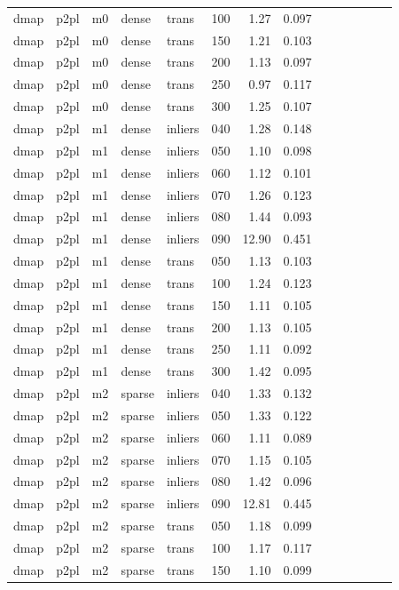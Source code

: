 \begin{table}[htbp]
\begin{tabular}{llllllrrrrrrrr}
  dmap & p2pl & m0 & dense & trans & 100 & 1.27 & 0.097 \\
  dmap & p2pl & m0 & dense & trans & 150 & 1.21 & 0.103 \\
  dmap & p2pl & m0 & dense & trans & 200 & 1.13 & 0.097 \\
  dmap & p2pl & m0 & dense & trans & 250 & 0.97 & 0.117 \\
  dmap & p2pl & m0 & dense & trans & 300 & 1.25 & 0.107 \\
  dmap & p2pl & m1 & dense & inliers & 040 & 1.28 & 0.148 \\
  dmap & p2pl & m1 & dense & inliers & 050 & 1.10 & 0.098 \\
  dmap & p2pl & m1 & dense & inliers & 060 & 1.12 & 0.101 \\
  dmap & p2pl & m1 & dense & inliers & 070 & 1.26 & 0.123 \\
  dmap & p2pl & m1 & dense & inliers & 080 & 1.44 & 0.093 \\
  dmap & p2pl & m1 & dense & inliers & 090 & 12.90 & 0.451 \\
  dmap & p2pl & m1 & dense & trans & 050 & 1.13 & 0.103 \\
  dmap & p2pl & m1 & dense & trans & 100 & 1.24 & 0.123 \\
  dmap & p2pl & m1 & dense & trans & 150 & 1.11 & 0.105 \\
  dmap & p2pl & m1 & dense & trans & 200 & 1.13 & 0.105 \\
  dmap & p2pl & m1 & dense & trans & 250 & 1.11 & 0.092 \\
  dmap & p2pl & m1 & dense & trans & 300 & 1.42 & 0.095 \\
  dmap & p2pl & m2 & sparse & inliers & 040 & 1.33 & 0.132 \\
  dmap & p2pl & m2 & sparse & inliers & 050 & 1.33 & 0.122 \\
  dmap & p2pl & m2 & sparse & inliers & 060 & 1.11 & 0.089 \\
  dmap & p2pl & m2 & sparse & inliers & 070 & 1.15 & 0.105 \\
  dmap & p2pl & m2 & sparse & inliers & 080 & 1.42 & 0.096 \\
  dmap & p2pl & m2 & sparse & inliers & 090 & 12.81 & 0.445 \\
  dmap & p2pl & m2 & sparse & trans & 050 & 1.18 & 0.099 \\
  dmap & p2pl & m2 & sparse & trans & 100 & 1.17 & 0.117 \\
  dmap & p2pl & m2 & sparse & trans & 150 & 1.10 & 0.099 \\

\end{tabular}
\end{table}
